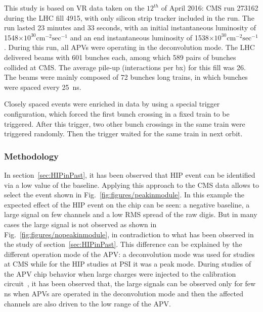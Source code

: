 This study is based on VR data taken on the $12^{th}$ of April 2016: CMS run 273162 during the LHC fill 4915, with only silicon strip tracker included in the run. The run lasted 23 minutes and 33 seconds, with an initial instantaneous luminosity of 1548$\times 10^{30} \mathrm{cm^{-2} sec^{-1}}$ and an end instantaneous luminosity of 1538$\times 10^{30} \mathrm{cm^{-2} sec^{-1}}$. During this run, all APVs were operating in the deconvolution mode. The LHC delivered beams with 601 bunches each, among which 589 pairs of bunches collided at CMS. The average pile-up (interactions per bx) for this fill was 26. The beams were mainly composed of 72 bunches long trains, in which bunches were spaced every 25~ns.

Closely spaced events were enriched in data by using a special trigger configuration, which forced the first bunch crossing in a fixed train to be triggered. After this trigger, two other bunch crossings in the same train were triggered randomly. Then the trigger waited for the same train in next orbit. 





 \subsubsection{Methodology}
 

In section~\ref{sec:HIPinPast}, it has been observed that HIP event can be identified via a low value of the baseline. Applying this approach to the CMS data allows to select the event shown in Fig.~\ref{fig:figures/peakinmodule}. In this example the expected effect of the HIP event on the chip can be seen: a negative baseline, a large signal on few channels and a low RMS spread of the raw digis. But in many cases the large signal is not observed as shown in Fig.~\ref{fig:figures/nopeakinmodule}, in contradiction to what has been observed in the study of section~\ref{sec:HIPinPast}. This difference can be explained by the different operation mode of the APV: a deconvolution mode was used for studies at CMS while for the HIP studies at PSI it was a peak mode. During studies of the APV chip behavior when large charges were injected to the calibration circuit~\cite{Bainbridge:2002bda}, it has been observed that, the large signals can be observed only for few ns when APVs are operated in the deconvolution mode and then the affected channels are also driven to the low range of the APV. 

